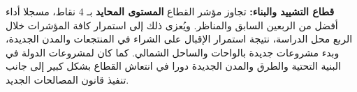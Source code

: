 \textbf{قطاع التشييد والبناء:} تجاوز مؤشر القطاع \textbf{المستوى المحايد} بـ 4 نقاط، مسجلا أداء أفضل من الربعين السابق والمناظر. ويُعزى ذلك إلى استمرار كافة المؤشرات خلال الربع محل الدراسة، نتيجة استمرار الإقبال على الشراء في المنتجعات والمدن الجديدة، وبدء مشروعات جديدة بالواحات والساحل الشمالي. كما كان لمشروعات الدولة في البنية التحتية والطرق والمدن الجديدة دورا في انتعاش القطاع بشكل كبير إلى جانب تنفيذ قانون المصالحات الجديد.
